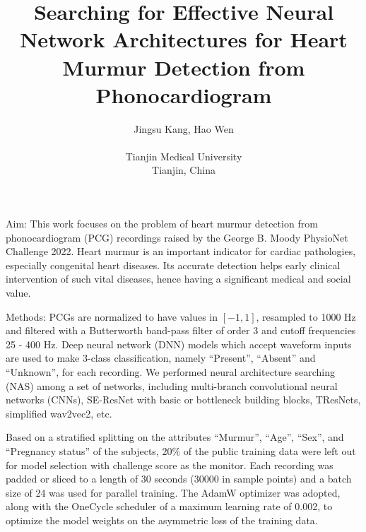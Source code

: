 \documentclass{cinc-abstract}
\begin{document}
\title{Searching for Effective Neural Network Architectures for Heart Murmur Detection from Phonocardiogram}

\author {Jingsu Kang, Hao Wen\\ %
\ \\ %
Tianjin Medical University\\  %
Tianjin, China} %

\maketitle



Aim: This work focuses on the problem of heart murmur detection from phonocardiogram (PCG) recordings raised by the George B. Moody PhysioNet Challenge 2022. Heart murmur is an important indicator for cardiac pathologies, especially congenital heart diseases. Its accurate detection helps early clinical intervention of such vital diseases, hence having a significant medical and social value.

Methods: PCGs are normalized to have values in $[-1, 1]$, resampled to 1000 Hz and filtered with a Butterworth band-pass filter of order 3 and cutoff frequencies 25 - 400 Hz. Deep neural network (DNN) models which accept waveform inputs are used to make 3-class classification, namely ``Present'', ``Absent'' and ``Unknown'', for each recording. We performed neural architecture searching (NAS) among a set of networks, including multi-branch convolutional neural networks (CNNs), SE-ResNet with basic or bottleneck building blocks, TResNets, simplified wav2vec2, etc.

Based on a stratified splitting on the attributes ``Murmur'', ``Age'', ``Sex'', and ``Pregnancy status'' of the subjects, 20\% of the public training data were left out for model selection with challenge score as the monitor. Each recording was padded or sliced to a length of 30 seconds (30000 in sample points) and a batch size of 24 was used for parallel training. The AdamW optimizer was adopted, along with the OneCycle scheduler of a maximum learning rate of 0.002, to optimize the model weights on the asymmetric loss of the training data.
\end{document}
